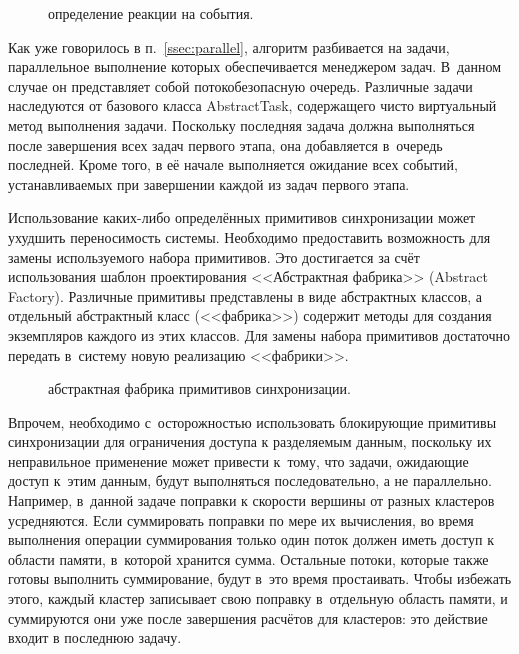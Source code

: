 \documentclass[a4paper, 14pt, titlepage]{extarticle}
\newcommand{\eng}[1]{{\English #1}}
\newcommand{\includefigure}[2]{
    \begin{figure}[!htb]
      \center{\texttt{[image: \#1]}}
      \caption{#2} \label{fig:#1}
    \end{figure}
  }
\begin{document}
        \includefigure{core-reactions}{определение реакции на события.}

        Как уже говорилось в п.~\ref{ssec:parallel}, алгоритм разбивается на задачи, параллельное
        выполнение которых обеспечивается менеджером задач. В~данном случае он
        представляет собой потокобезопасную очередь. Различные задачи наследуются от базового
        класса AbstractTask, содержащего чисто виртуальный метод выполнения задачи.
        Поскольку последняя задача должна выполняться после завершения всех задач первого этапа, она
        добавляется в~очередь последней. Кроме того, в её начале выполняется ожидание всех событий,
        устанавливаемых при завершении каждой из задач первого этапа.

        Использование каких-либо определённых примитивов синхронизации может ухудшить переносимость
        системы. Необходимо предоставить возможность для замены используемого набора примитивов.
        Это достигается за счёт использования шаблон проектирования <<Абстрактная фабрика>> (\eng{Abstract
        Factory}). Различные примитивы представлены в виде абстрактных классов, а отдельный
        абстрактный класс (<<фабрика>>) содержит методы для создания экземпляров каждого из этих
        классов. Для замены набора примитивов достаточно передать в~систему новую реализацию
        <<фабрики>>.

        \includefigure{parallel}{абстрактная фабрика примитивов синхронизации.}

        Впрочем, необходимо с~осторожностью использовать блокирующие примитивы синхронизации для
        ограничения доступа к разделяемым данным, поскольку их неправильное применение может
        привести к~тому, что задачи, ожидающие доступ к~этим данным, будут выполняться
        последовательно, а не параллельно.  Например, в~данной задаче поправки к скорости вершины от
        разных кластеров усредняются. Если суммировать поправки по мере их вычисления, во время
        выполнения операции суммирования только один поток должен иметь доступ к области памяти,
        в~которой хранится сумма. Остальные потоки, которые также готовы выполнить суммирование,
        будут в~это время простаивать. Чтобы избежать этого, каждый кластер записывает свою поправку
        в~отдельную область памяти, и суммируются они уже после завершения расчётов для кластеров:
        это действие входит в последнюю задачу.
\end{document}
